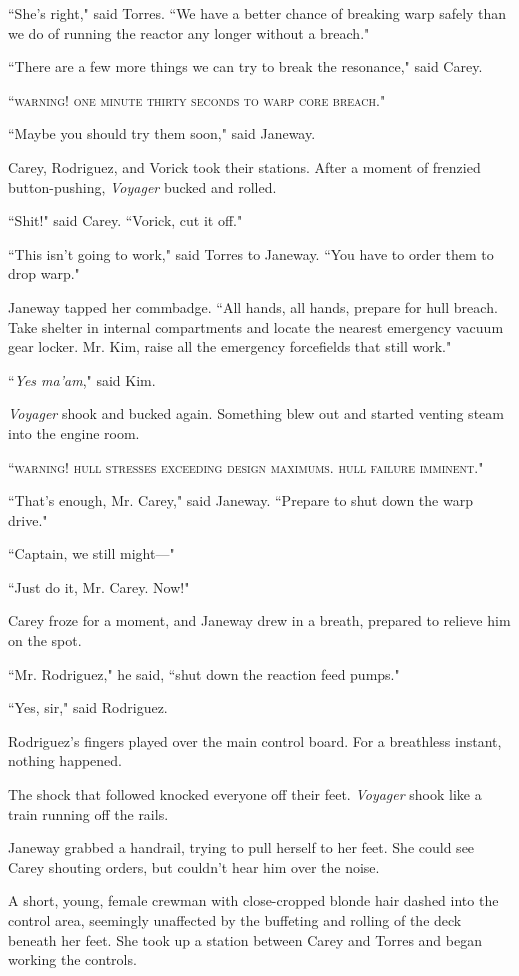 \documentclass[twoside,letterpaper,12pt]{memoir}
\begin{document}
``She's right," said Torres. ``We have a better chance of breaking warp safely than we do of running the reactor any longer without a breach."

``There are a few more things we can try to break the resonance," said Carey.

``\textsc{warning! one minute thirty seconds to warp core breach}."

``Maybe you should try them soon," said Janeway.

Carey, Rodriguez, and Vorick took their stations. After a moment of frenzied button-pushing, \textit{Voyager} bucked and rolled.

``Shit!" said Carey. ``Vorick, cut it off."

``This isn't going to work," said Torres to Janeway. ``You have to order them to drop warp."

Janeway tapped her commbadge. ``All hands, all hands, prepare for hull breach. Take shelter in internal compartments and locate the nearest emergency vacuum gear locker. Mr. Kim, raise all the emergency forcefields that still work."

``\textit{Yes ma'am}," said Kim.

\textit{Voyager} shook and bucked again. Something blew out and started venting steam into the engine room.

``\textsc{warning! hull stresses exceeding design maximums. hull failure imminent}."

``That's enough, Mr. Carey," said Janeway. ``Prepare to shut down the warp drive."

``Captain, we still might---"

``Just do it, Mr. Carey. Now!"

Carey froze for a moment, and Janeway drew in a breath, prepared to relieve him on the spot.

``Mr. Rodriguez," he said, ``shut down the reaction feed pumps."

``Yes, sir," said Rodriguez.

Rodriguez's fingers played over the main control board. For a breathless instant, nothing happened.

The shock that followed knocked everyone off their feet. \textit{Voyager} shook like a train running off the rails.

Janeway grabbed a handrail, trying to pull herself to her feet. She could see Carey shouting orders, but couldn't hear him over the noise.

A short, young, female crewman with close-cropped blonde hair dashed into the control area, seemingly unaffected by the buffeting and rolling of the deck beneath her feet. She took up a station between Carey and Torres and began working the controls.
\end{document}
